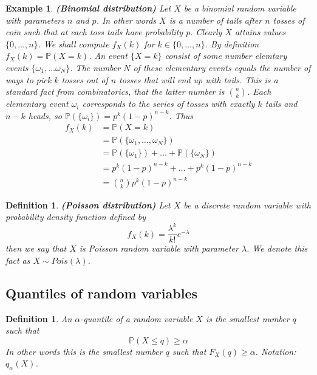 \documentclass[12pt]{article}
\newtheorem{definition}[theorem]{Definition}
\newtheorem{example}[theorem]{Example}
\begin{document}
\begin{example} \textbf{(Binomial distribution)} Let $X$ be a binomial random
    variable with parameters $n$ and $p$. In other words $X$ is a number of
    tails after $n$ tosses of coin such that at each toss tails have probability
    $p$. Clearly $X$ attains values $\{0,\ldots,n\}$. We shall compute $f_X(k)$
    for $k\in \{0,\ldots,n\}$. By definition $f_X(k)=\mathbb{P}(X=k)$. An event
    $\{X=k\}$ consist of some number elemtary events
    $\{\omega_1,\ldots\omega_N\}$. The number $N$ of these elementary events
    equals the number of ways to pick $k$ tosses out of $n$ tosses that will end
    up with tails. This is a standard fact from combinatorics, that the latter
    number is $\binom{n}{k}$. Each elementary event $\omega_i$ corresponds to
    the series of tosses with exactly $k$ tails and $n-k$ heads, so
    $\mathbb{P}(\{\omega_i\})=p^k{(1-p)}^{n-k}$. Thus
    \begin{align*}
        f_X(k)
         & =\mathbb{P}(X=k)                          \\
         & =\mathbb{P}(\{\omega_1,\ldots,\omega_N\}) \\
         & =\mathbb{P}(\{\omega_1\})+
        \ldots+\mathbb{P}(\{\omega_N\})              \\ %
         & =p^k{(1-p)}^{n-k}+
        \ldots+p^k{(1-p)}^{n-k}                      \\
         & =\binom{n}{k}p^k{(1-p)}^{n-k}
    \end{align*}
\end{example}

\begin{definition} \textbf{(Poisson distribution)} Let $X$ be a discrete random
    variable with probability density function defined by
    $$
        f_X(k)=\frac{\lambda^k}{k!}e^{-\lambda}
    $$
    then we say that $X$ is Poisson random variable with parameter $\lambda$. We
    denote this fact as $X\sim Pois(\lambda)$.
\end{definition}


\subsection{Quantiles of random variables}

\begin{definition} An $\alpha$-quantile of a random variable $X$ is the smallest
    number $q$ such that
    $$
        \mathbb{P}(X\leq q)\geq\alpha
    $$
    In other words this is the smallest number $q$ such that $F_X(q)\geq
        \alpha$. Notation: $q_\alpha(X)$.
\end{definition}
\end{document}
